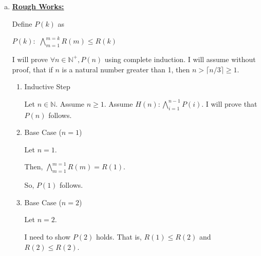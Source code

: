 \documentclass[12pt]{article}
\begin{document}
\begin{enumerate}[a.]
    \item

    \bigskip

    \begin{mdframed}

    \underline{\textbf{Rough Works:}}

    \bigskip

    Define $P(k)$ as

    \begin{center}
        $P(k):$ $\bigwedge\limits_{m=1}^{m=k} R(m) \leq R(k)$
    \end{center}

    \bigskip

    I will prove $\forall n \in \mathbb{N}^+, P(n)$ using complete induction.
    I will assume without proof, that if $n$ is a natural number greater than 1,
    then $n > \lceil n/3 \rceil \geq 1$.

    \bigskip

    \begin{enumerate}[1.]
        \item Inductive Step

        \begin{mdframed}
        Let $n \in \mathbb{N}$. Assume $n \geq 1$. Assume $H(n):\bigwedge\limits_{i=1}^{n-1} P(i)$.
        I will prove that $P(n)$ follows.

        \end{mdframed}

        \item Base Case ($n = 1$)

        \begin{mdframed}
        Let $n = 1$.

        \bigskip

        Then, $\bigwedge\limits_{m=1}^{m=1} R(m) = R(1)$.

        \bigskip

        So, $P(1)$ follows.

        \end{mdframed}

        \item Base Case ($n = 2$)

        \begin{mdframed}
        Let $n = 2$.

        \bigskip

        I need to show $P(2)$ holds. That is, $R(1) \leq R(2)$ and $R(2) \leq R(2)$.

        \bigskip


\end{mdframed}
\end{enumerate}
\end{mdframed}
\end{enumerate}
\end{document}
